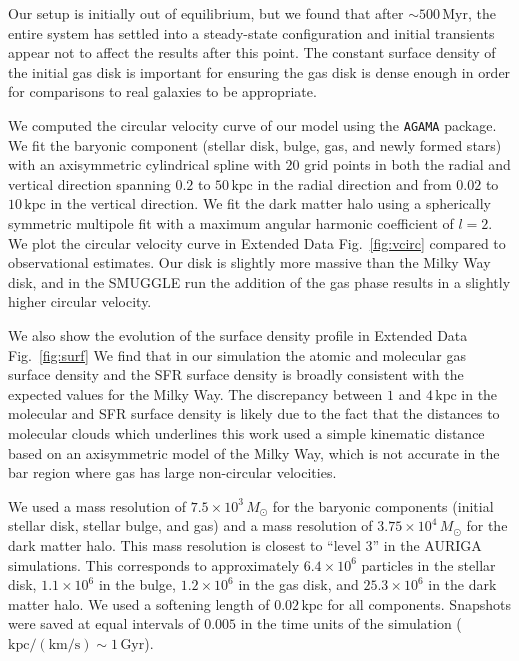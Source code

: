 \documentclass{natureprintstyle}
\begin{document}
Our setup is initially out of equilibrium, but we found that after
$\sim500\,\textrm{Myr}$, the entire system has settled into a steady-state
configuration and initial transients appear not to affect the results after
this point. The constant surface density of the initial gas disk is important
for ensuring the gas disk is dense enough in order for comparisons to real
galaxies to be appropriate.

We computed the circular velocity curve of our model using the \texttt{AGAMA}
package.\cite{2019MNRAS.482.1525V} We fit the baryonic component (stellar
disk, bulge, gas, and newly formed stars) with an axisymmetric cylindrical
spline with $20$ grid points in both the radial and vertical direction
spanning $0.2$ to $50\,\textrm{kpc}$ in the radial direction and from $0.02$
to $10\,\textrm{kpc}$ in the vertical direction. We fit the dark matter halo
using a spherically symmetric multipole fit with a maximum angular harmonic
coefficient of $l=2$. We plot the circular velocity curve in Extended Data
Fig.~\ref{fig:vcirc} compared to observational
estimates.\cite{2019ApJ...871..120E} Our disk is slightly more massive than
the Milky Way disk, and in the SMUGGLE run the addition of the gas phase
results in a slightly higher circular velocity.

We also show the evolution of the surface density profile in Extended Data
Fig.~\ref{fig:surf} We find that in our simulation the atomic and molecular
gas surface density and the SFR surface density is broadly consistent with the
expected values for the Milky
Way.\cite{2008AA...487..951K,2022ApJ...929L..18E} The discrepancy between $1$
and $4\,\textrm{kpc}$ in the molecular and SFR surface density is likely due
to the fact that the distances to molecular clouds which underlines this work
used a simple kinematic distance based on an axisymmetric model of the Milky
Way,\cite{2017ApJ...834...57M} which is not accurate in the bar region where
gas has large non-circular velocities.

We used a mass resolution of $7.5\times10^3\,M_{\odot}$ for the baryonic
components (initial stellar disk, stellar bulge, and gas) and a mass
resolution of $3.75\times10^4\,M_{\odot}$ for the dark matter halo. This mass
resolution is closest to ``level 3'' in the AURIGA
simulations.\cite{2017MNRAS.467..179G} This corresponds to approximately
$6.4\times10^6$ particles in the stellar disk, $1.1\times10^6$ in the bulge,
$1.2\times10^6$ in the gas disk, and $25.3\times10^6$ in the dark matter halo.
We used a softening length of $0.02\,\textrm{kpc}$ for all components.
Snapshots were saved at equal intervals of $0.005$ in the time units of the
simulation ($\textrm{kpc}/(\textrm{km}/\textrm{s})\sim1\,\textrm{Gyr}$).
\end{document}
